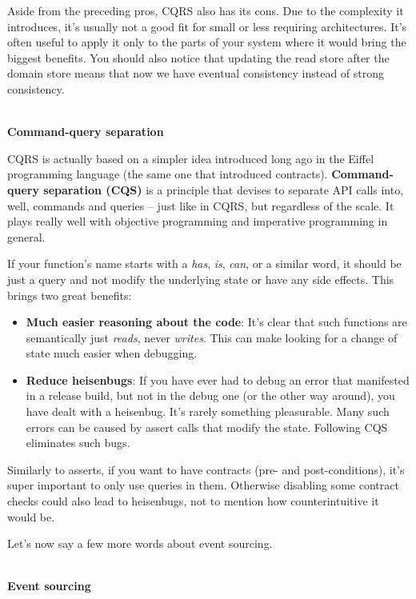 Aside from the preceding pros, CQRS also has its cons. Due to the complexity it introduces, it's usually not a good fit for small or less requiring architectures. It's often useful to apply it only to the parts of your system where it would bring the biggest benefits. You should also notice that updating the read store after the domain store means that now we have eventual consistency instead of strong consistency.


\hspace*{\fill} \\ %
\noindent
\textbf{Command-query separation}

CQRS is actually based on a simpler idea introduced long ago in the Eiffel programming language (the same one that introduced contracts). \textbf{Command-query separation (CQS)} is a principle that devises to separate API calls into, well, commands and queries – just like in CQRS, but regardless of the scale. It plays really well with objective programming and imperative programming in general.

If your function's name starts with a \textit{has}, \textit{is}, \textit{can}, or a similar word, it should be just a query and not modify the underlying state or have any side effects. This brings two great benefits:


\begin{itemize}
\item 
\textbf{Much easier reasoning about the code}: It's clear that such functions are semantically just \textit{reads}, never \textit{writes}. This can make looking for a change of state much easier when debugging.

\item 
\textbf{Reduce heisenbugs}: If you have ever had to debug an error that manifested in a release build, but not in the debug one (or the other way around), you have dealt with a heisenbug. It's rarely something pleasurable. Many such errors can be caused by assert calls that modify the state. Following CQS eliminates such bugs.
\end{itemize}

Similarly to asserts, if you want to have contracts (pre- and post-conditions), it's super important to only use queries in them. Otherwise disabling some contract checks could also lead to heisenbugs, not to mention how counterintuitive it would be.

Let's now say a few more words about event sourcing.


\hspace*{\fill} \\ %
\noindent
\textbf{Event sourcing}

